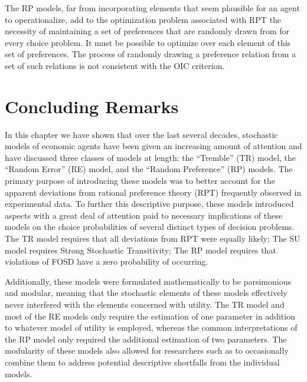 \documentclass[../main.tex]{subfiles}
\begin{document}
The RP models, far from incorporating elements that seem plausible for an agent to operationalize, add to the optimization problem associated with RPT the necessity of maintaining a set of preferences that are randomly drawn from for every choice problem.
It must be possible to optimize over each element of this set of preferences.
The process of randomly drawing a preference relation from a set of such relations is not consistent with the OIC criterion.

\section{Concluding Remarks}

In this chapter we have shown that over the last several decades, stochastic models of economic agents have been given an increasing amount of attention and have discussed three classes of models at length: the \enquote{Tremble} (TR) model, the \enquote{Random Error} (RE) model, and the \enquote{Random Preference} (RP) models.
The primary purpose of introducing these models was to better account for the apparent deviations from rational preference theory (RPT) frequently observed in experimental data.
To further this descriptive purpose, these models introduced aspects with a great deal of attention paid to necessary implications of these models on the choice probabilities of several distinct types of decision problems.
The TR model requires that all deviations from RPT were equally likely;
The SU model requires Strong Stochastic Transitivity;
The RP model requires that violations of FOSD have a zero probability of occurring.

Additionally, these models were formulated mathematically to be parsimonious and modular, meaning that the stochastic elements of these models effectively never interfered with the elements concerned with utility.
The TR model and most of the RE models only require the estimation of one parameter in addition to whatever model of utility is employed, whereas the common interpretations of the RP model only required the additional estimation of two parameters.
The modularity of these models also allowed for researchers such as \textcite{Loomes2002} to occasionally combine them to address potential descriptive shortfalls from the individual models.
\end{document}
